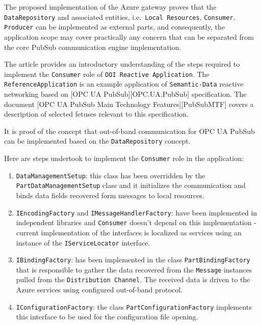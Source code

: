 \documentclass[
]{article}
\providecommand{\tightlist}{%
  \setlength{\itemsep}{0pt}\setlength{\parskip}{0pt}}
\begin{document}
The proposed implementation of the Azure gateway proves that the
\texttt{DataRepository} and associated entities,
i.e.~\texttt{Local\ Resources}, \texttt{Consumer}, \texttt{Producer} can
be implemented as external parts, and consequently, the application
scope may cover practically any concern that can be separated from the
core PubSub communication engine implementation.

The article provides an introductory understanding of the steps required
to implement the \texttt{Consumer} role of
\texttt{OOI\ Reactive\ Application}. The \texttt{ReferenceApplication}
is an example application of \texttt{Semantic-Data} reactive networking
based on {[}OPC UA PubSub{]}{[}OPC.UA.PubSub{]} specification. The
document {[}OPC UA PubSub Main Technology Features{]}{[}PubSubMTF{]}
covers a description of selected fetuses relevant to this specification.

It is proof of the concept that out-of-band communication for OPC UA
PubSub can be implemented based on the \texttt{DataRepository} concept.

Here are steps undertook to implement the \texttt{Consumer} role in the
application:

\begin{enumerate}
\def\labelenumi{\arabic{enumi}.}
\tightlist
\item
  \texttt{DataManagementSetup}: this class has been overridden by the
  \texttt{PartDataManagementSetup} class and it initializes the
  communication and binds data fields recovered form messages to local
  resources.
\item
  \texttt{IEncodingFactory} and \texttt{IMessageHandlerFactory}: have
  been implemented in independent libraries and \texttt{Consumer}
  doesn't depend on this implementation - current implementation of the
  interfaces is localized as services using an instance of the
  \texttt{IServiceLocator} interface.
\item
  \texttt{IBindingFactory}: has been implemented in the class
  \texttt{PartBindingFactory} that is responsible to gather the data
  recovered from the \texttt{Message} instances pulled from the
  \texttt{Distribution\ Channel}. The received data is driven to the
  Azure services using configured out-of-band protocol.
\item
  \texttt{IConfigurationFactory}: the class
  \texttt{PartConfigurationFactory} implements this interface to be used
  for the configuration file opening.
\end{enumerate}
\end{document}
